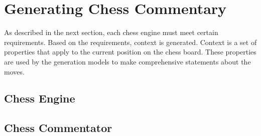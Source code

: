 \section{Generating Chess Commentary}


As described in the next section, each chess engine must meet certain requirements. Based on the requirements, context is generated. Context is a set of properties that apply to the current position on the chess board. These properties are used by the generation models to make comprehensive statements about the moves.


\subsection{Chess Engine}







\subsection{Chess Commentator}

